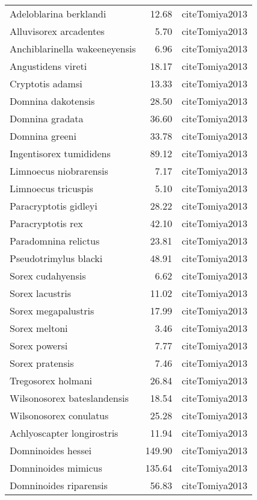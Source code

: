 \begin{table}[ht]
\begin{tabular}{lrl}
  Adeloblarina berklandi & 12.68 & cite{Tomiya2013} \\ 
  Alluvisorex arcadentes & 5.70 & cite{Tomiya2013} \\ 
  Anchiblarinella wakeeneyensis & 6.96 & cite{Tomiya2013} \\ 
  Angustidens vireti & 18.17 & cite{Tomiya2013} \\ 
  Cryptotis adamsi & 13.33 & cite{Tomiya2013} \\ 
  Domnina dakotensis & 28.50 & cite{Tomiya2013} \\ 
  Domnina gradata & 36.60 & cite{Tomiya2013} \\ 
  Domnina greeni & 33.78 & cite{Tomiya2013} \\ 
  Ingentisorex tumididens & 89.12 & cite{Tomiya2013} \\ 
  Limnoecus niobrarensis & 7.17 & cite{Tomiya2013} \\ 
  Limnoecus tricuspis & 5.10 & cite{Tomiya2013} \\ 
  Paracryptotis gidleyi & 28.22 & cite{Tomiya2013} \\ 
  Paracryptotis rex & 42.10 & cite{Tomiya2013} \\ 
  Paradomnina relictus & 23.81 & cite{Tomiya2013} \\ 
  Pseudotrimylus blacki & 48.91 & cite{Tomiya2013} \\ 
  Sorex cudahyensis & 6.62 & cite{Tomiya2013} \\ 
  Sorex lacustris & 11.02 & cite{Tomiya2013} \\ 
  Sorex megapalustris & 17.99 & cite{Tomiya2013} \\ 
  Sorex meltoni & 3.46 & cite{Tomiya2013} \\ 
  Sorex powersi & 7.77 & cite{Tomiya2013} \\ 
  Sorex pratensis & 7.46 & cite{Tomiya2013} \\ 
  Tregosorex holmani & 26.84 & cite{Tomiya2013} \\ 
  Wilsonosorex bateslandensis & 18.54 & cite{Tomiya2013} \\ 
  Wilsonosorex conulatus & 25.28 & cite{Tomiya2013} \\ 
  Achlyoscapter longirostris & 11.94 & cite{Tomiya2013} \\ 
  Domninoides hessei & 149.90 & cite{Tomiya2013} \\ 
  Domninoides mimicus & 135.64 & cite{Tomiya2013} \\ 
  Domninoides riparensis & 56.83 & cite{Tomiya2013} \\ 

\end{tabular}
\end{table}
